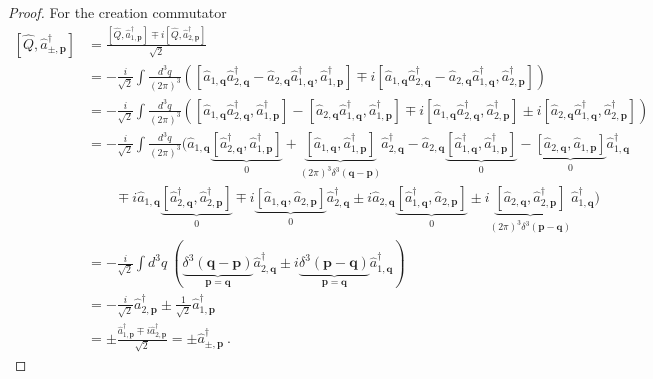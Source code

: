 \begin{proof}
        For the creation commutator 
        \begin{equation*}
        \begin{aligned}
            [\hat Q, \hat a_{\pm, \mathbf p}^\dagger] & = \frac{[\hat Q, \hat a_{1, \mathbf p}^\dagger] \mp i [\hat Q, \hat a_{2, \mathbf p}^\dagger]}{\sqrt{2}} \\ & = - \frac{i}{\sqrt{2}} \int \frac{d^3 q}{(2\pi)^3} ( [\hat a_{1, \mathbf q} \hat a_{2, \mathbf q}^\dagger - \hat a_{2, \mathbf q} \hat a_{1, \mathbf q}^\dagger, \hat a_{1, \mathbf p}^\dagger]  \mp i  [\hat a_{1, \mathbf q} \hat a_{2, \mathbf q}^\dagger - \hat a_{2, \mathbf q} \hat a_{1, \mathbf q}^\dagger, \hat a_{2, \mathbf p}^\dagger]) \\ & = - \frac{i}{\sqrt{2}} \int \frac{d^3 q}{(2\pi)^3} ( [\hat a_{1, \mathbf q} \hat a_{2, \mathbf q}^\dagger, \hat a_{1, \mathbf p}^\dagger] - [\hat a_{2, \mathbf q} \hat a_{1, \mathbf q}^\dagger, \hat a_{1, \mathbf p}^\dagger] \mp i [\hat a_{1, \mathbf q} \hat a_{2, \mathbf q}^\dagger, \hat a_{2, \mathbf p}^\dagger] \pm i [\hat a_{2, \mathbf q} \hat a_{1, \mathbf q}^\dagger, \hat a_{2, \mathbf p}^\dagger]) \\ & = - \frac{i}{\sqrt{2}} \int \frac{d^3 q}{(2\pi)^3} ( \hat a_{1, \mathbf q} \underbrace{[\hat a_{2, \mathbf q}^\dagger, \hat a_{1, \mathbf p}^\dagger]}_0 + \underbrace{[\hat a_{1, \mathbf q}, \hat a_{1, \mathbf p}^\dagger]}_{(2\pi)^3 \delta^3 (\mathbf q - \mathbf p)} \hat a_{2, \mathbf q}^\dagger - \hat a_{2, \mathbf q}  \underbrace{[\hat a_{1, \mathbf q}^\dagger, \hat a_{1, \mathbf p}^\dagger]}_0 - \underbrace{[\hat a_{2, \mathbf q}, \hat a_{1, \mathbf p}]}_0 \hat a_{1, \mathbf q}^\dagger \\ & \qquad \mp i \hat a_{1, \mathbf q} \underbrace{[\hat a_{2, \mathbf q}^\dagger, \hat a_{2, \mathbf p}^\dagger]}_0 \mp i \underbrace{[\hat a_{1, \mathbf q} , \hat a_{2, \mathbf p}]}_0 \hat a_{2, \mathbf q}^\dagger \pm i \hat a_{2, \mathbf q} \underbrace{[ \hat a_{1, \mathbf q}^\dagger, \hat a_{2, \mathbf p}]}_0 \pm i \underbrace{[\hat a_{2, \mathbf q}, \hat a_{2, \mathbf p}^\dagger]}_{(2\pi)^3 \delta^3 (\mathbf p - \mathbf q)} \hat a_{1, \mathbf q}^\dagger) \\ & = - \frac{i}{\sqrt{2}} \int d^3 q ~ ( \underbrace{\delta^3 (\mathbf q - \mathbf p)}_{\mathbf p = \mathbf q} \hat a_{2, \mathbf q}^\dagger \pm i \underbrace{\delta^3 (\mathbf p - \mathbf q)}_{\mathbf p = \mathbf q} \hat a_{1, \mathbf q}^\dagger ) \\ & = - \frac{i}{\sqrt{2}} \hat a_{2, \mathbf p}^\dagger \pm \frac{1}{\sqrt{2}} \hat a_{1, \mathbf p}^\dagger \\ & = \pm \frac{\hat a_{1, \mathbf p}^\dagger \mp i \hat a_{2, \mathbf p}^\dagger}{\sqrt{2}} = \pm \hat a_{\pm, \mathbf p}^\dagger ~.
        \end{aligned}
        \end{equation*}
    \end{proof}

